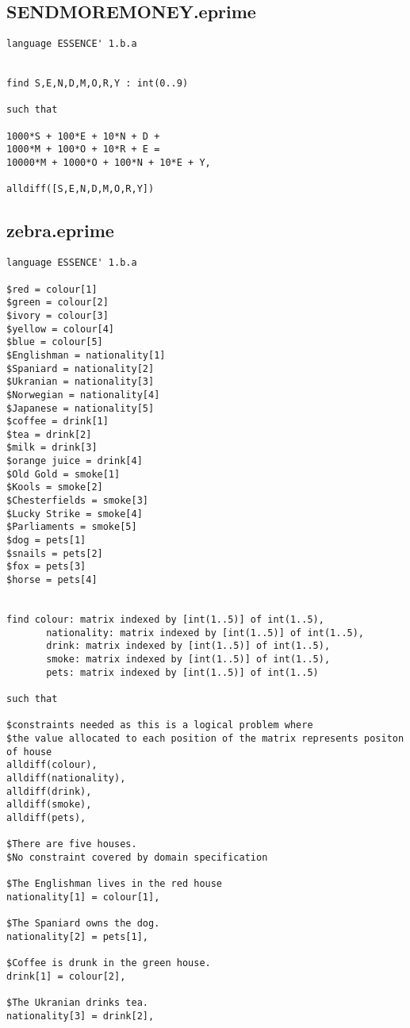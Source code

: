 \documentclass{article}
\begin{document}
\subsection{SENDMOREMONEY.eprime}
\begin{verbatim}
language ESSENCE' 1.b.a


find S,E,N,D,M,O,R,Y : int(0..9)

such that

1000*S + 100*E + 10*N + D + 
1000*M + 100*O + 10*R + E =
10000*M + 1000*O + 100*N + 10*E + Y,

alldiff([S,E,N,D,M,O,R,Y])
\end{verbatim}
\subsection{zebra.eprime}
\begin{verbatim}
language ESSENCE' 1.b.a

$red = colour[1]
$green = colour[2]
$ivory = colour[3]
$yellow = colour[4]
$blue = colour[5]
$Englishman = nationality[1]
$Spaniard = nationality[2]
$Ukranian = nationality[3]
$Norwegian = nationality[4]
$Japanese = nationality[5]
$coffee = drink[1]
$tea = drink[2]
$milk = drink[3]
$orange juice = drink[4]
$Old Gold = smoke[1]
$Kools = smoke[2]
$Chesterfields = smoke[3]
$Lucky Strike = smoke[4]
$Parliaments = smoke[5]
$dog = pets[1]
$snails = pets[2]
$fox = pets[3]
$horse = pets[4]


find colour: matrix indexed by [int(1..5)] of int(1..5),
       nationality: matrix indexed by [int(1..5)] of int(1..5),
       drink: matrix indexed by [int(1..5)] of int(1..5),
       smoke: matrix indexed by [int(1..5)] of int(1..5),
       pets: matrix indexed by [int(1..5)] of int(1..5)

such that

$constraints needed as this is a logical problem where 
$the value allocated to each position of the matrix represents positon of house
alldiff(colour),
alldiff(nationality),
alldiff(drink),
alldiff(smoke),
alldiff(pets),

$There are five houses.
$No constraint covered by domain specification

$The Englishman lives in the red house
nationality[1] = colour[1],

$The Spaniard owns the dog.
nationality[2] = pets[1],

$Coffee is drunk in the green house.
drink[1] = colour[2],

$The Ukranian drinks tea.
nationality[3] = drink[2],


\end{verbatim}
\end{document}
